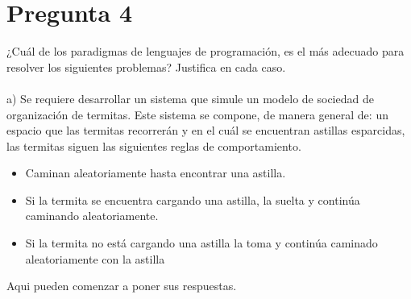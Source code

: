 \newpage
\section*{Pregunta 4}
\Large 
¿Cuál de los paradigmas de lenguajes de programación, es el más adecuado para resolver los siguientes problemas? Justifica en cada caso.\\\\
a) Se requiere desarrollar un sistema que simule un modelo de sociedad de organización de termitas. Este sistema se compone, de manera general de: un espacio que las termitas recorrerán y en el cuál se encuentran astillas esparcidas, las termitas siguen las siguientes reglas de comportamiento.\\
\begin{itemize}
\item Caminan aleatoriamente hasta encontrar una astilla.
\item Si la termita se encuentra cargando una astilla, la suelta y continúa caminando aleatoriamente.
\item Si la termita no está cargando una astilla la toma y continúa caminado aleatoriamente con la astilla
\end{itemize}
\large
Aqui pueden comenzar a poner sus respuestas.\\

